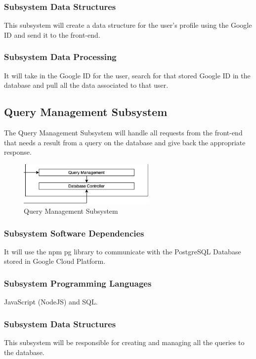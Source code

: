 \subsubsection{Subsystem Data Structures}
This subsystem will create a data structure for the user's profile using the Google ID and send it to the front-end.

\subsubsection{Subsystem Data Processing}
It will take in the Google ID for the user, search for that stored Google ID in the database and pull all the data associated to that user.

\subsection{Query Management Subsystem}
The Query Management Subsystem will handle all requests from the front-end that needs a result from
a query on the database and give back the appropriate response.

\begin{figure}[h!]
	\centering
 	\includegraphics[width=0.60\textwidth]{images/Screenshot (61).png}
 \caption{Query Management Subsystem}
\end{figure}


\subsubsection{Subsystem Software Dependencies}
It will use the npm pg library to communicate with the PostgreSQL Database stored in Google Cloud Platform.

\subsubsection{Subsystem Programming Languages}
JavaScript (NodeJS) and SQL.

\subsubsection{Subsystem Data Structures}
This subsystem will be responsible for creating and managing all the queries to the database.

